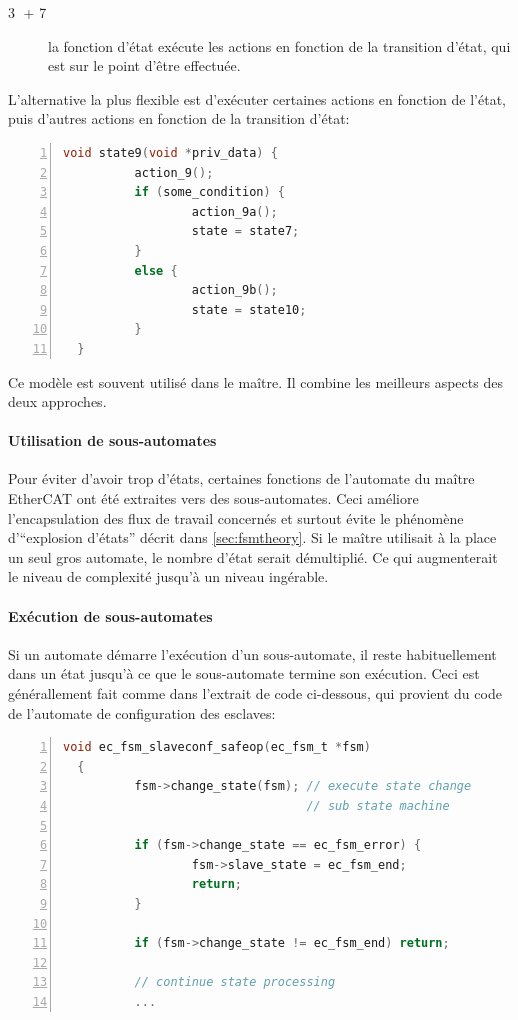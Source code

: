 \documentclass[a4paper,12pt,BCOR=6mm,bibtotoc,idxtotoc]{scrbook}
\newcommand{\linenum}[1]{\normalfont\textcircled{\tiny #1}}
\begin{document}
\begin{description}

\item[\linenum{3} + \linenum{7}] la fonction d'\'etat ex\'ecute les
  actions en fonction de la transition d'\'etat, qui est sur le point
  d'\^etre effectu\'ee.

\end{description}

L'alternative la plus flexible est d'ex\'ecuter certaines actions en
fonction de l'\'etat, puis d'autres actions en fonction de la
transition d'\'etat:

\begin{lstlisting}[gobble=2,language=C,numbers=left]
  void state9(void *priv_data) {
          action_9();
          if (some_condition) {
                  action_9a();
                  state = state7;
          }
          else {
                  action_9b();
                  state = state10;
          }
  }
\end{lstlisting}

Ce mod\`ele est souvent utilis\'e dans le ma\^itre. Il combine les
meilleurs aspects des deux approches.

\paragraph{Utilisation de sous-automates}

Pour \'eviter d'avoir trop d'\'etats, certaines fonctions de l'automate du
ma\^itre EtherCAT ont \'et\'e extraites vers des sous-automates.  Ceci
am\'eliore l'encapsulation des flux de travail concern\'es et surtout
\'evite le ph\'enom\`ene d'``explosion d'\'etats'' d\'ecrit dans
\autoref{sec:fsmtheory}. Si le ma\^itre utilisait \`a la place un seul
gros automate, le nombre d'\'etat serait d\'emultipli\'e. Ce qui
augmenterait le niveau de complexit\'e jusqu'\`a un niveau ing\'erable.

\paragraph{Ex\'ecution de sous-automates}

Si un automate d\'emarre l'ex\'ecution d'un sous-automate, il reste
habituellement dans un \'etat jusqu'\`a ce que le sous-automate
termine son ex\'ecution.  Ceci est g\'en\'erallement fait comme dans
l'extrait de code ci-dessous, qui provient du code de l'automate de
configuration des esclaves:

\begin{lstlisting}[gobble=2,language=C,numbers=left]
  void ec_fsm_slaveconf_safeop(ec_fsm_t *fsm)
  {
          fsm->change_state(fsm); // execute state change
                                  // sub state machine

          if (fsm->change_state == ec_fsm_error) {
                  fsm->slave_state = ec_fsm_end;
                  return;
          }

          if (fsm->change_state != ec_fsm_end) return;

          // continue state processing
          ...
\end{lstlisting}
\end{document}
